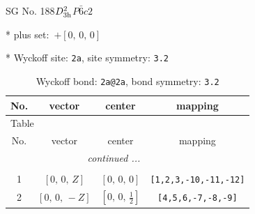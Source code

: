 \documentclass[fleqn,8pt]{jsarticle}
\begin{document}
\setcounter{MaxMatrixCols}{32}

\renewcommand{\tablename}{Table~}
\renewcommand{\figurename}{Figure~}
\begin{center}
\LARGE
SG No. 188\quad$D_{\rm 3h}^{2}$\quad$P\bar{6}c2$\quad[ hexagonal ]
\end{center}

* plus set:\,\,\,$+\left[ 0,\, 0,\, 0 \right]$


* Wyckoff site: {\tt 2a}, site symmetry: {\tt 3.2}
\renewcommand{\arraystretch}{1.2}
\begin{longtable}{cccc}
\caption{Wyckoff bond: {\tt 2a@2a}, bond symmetry: {\tt 3.2}}
 \\
 \hline \hline
No. & vector & center & mapping \\ \hline \endfirsthead

\multicolumn{3}{l}{\tablename\ \thetable{}} \\
 \hline \hline
No. & vector & center & mapping \\ \hline \endhead

 \hline \hline
\multicolumn{3}{r}{\footnotesize\it continued ...} \\ \endfoot

 \hline \hline
\multicolumn{3}{r}{} \\ \endlastfoot

1 & $\left[ 0,\, 0,\, Z \right]$ & $\left[ 0,\, 0,\, 0 \right]$ & {\tt [1,2,3,-10,-11,-12]} \\ \hline
2 & $\left[ 0,\, 0,\, - Z \right]$ & $\left[ 0,\, 0,\, \frac{1}{2} \right]$ & {\tt [4,5,6,-7,-8,-9]} \\
\end{longtable}
\renewcommand{\arraystretch}{1.2}
\end{document}
